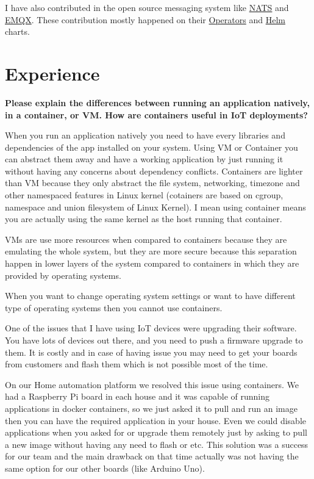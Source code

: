 I have also contributed in the open source messaging system like
\href{https://github.com/nats-io/}{NATS} and \href{https://github.com/emqx}{EMQX}.
These contribution mostly happened on their
\href{https://kubernetes.io/docs/concepts/extend-kubernetes/operator/}{Operators}
and \href{https://helm.sh/}{Helm} charts.

\section{Experience}

\noindent
\textbf{Please explain the differences between running an application natively, in a container, or VM.
How are containers useful in IoT deployments?}

When you run an application natively you need to have every libraries and dependencies of the app installed on your system.
Using VM or Container you can abstract them away and have a working application by just running it without
having any concerns about dependency conflicts.
Containers are lighter than VM because they only abstract the file system, networking, timezone and other namespaced
features in Linux kernel (cotainers are based on cgroup, namespace and union filesystem of Linux Kernel).
I mean using container means you are actually using the same kernel as the host running that container.

VMs are use more resources when compared to containers because they are emulating the whole system,
but they are more secure because this separation happen in lower layers of the system compared
to containers in which they are provided by operating systems.

When you want to change operating system settings or want to have different type of operating systems then you cannot
use containers.

One of the issues that I have using IoT devices were upgrading their software.
You have lots of devices out there, and you need to push a firmware upgrade to them.
It is costly and in case of having issue you may need to get your boards from customers and flash them
which is not possible most of the time.

On our Home automation platform we resolved this issue using containers. We had a Raspberry Pi board in each house
and it was capable of running applications in docker containers, so we just asked it to pull and run an image then
you can have the required application in your house. Even we could disable applications when you asked for or upgrade
them remotely just by asking to pull a new image without having any need to flash or etc.
This solution was a success for our team and the main drawback on that time actually was not having the same
option for our other boards (like Arduino Uno).

